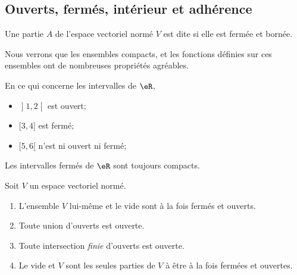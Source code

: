 \subsection{Ouverts, fermés, intérieur et adhérence}

\begin{proposition}
	Une partie $A$ de l'espace vectoriel normé $V$ est dite  si elle est fermée et bornée.
\end{proposition}

Nous verrons que les ensembles compacts, et les fonctions définies sur ces ensembles ont de nombreuses propriétés agréables.

\begin{example}		\label{ExempleFermeIntevrR}
	En ce qui concerne les intervalles de $\eR$,
	\begin{itemize}
		\item $\mathopen] 1 , 2 \mathclose[$ est ouvert;
		\item $\mathopen[ 3,  4 \mathclose]$ est fermé;
		\item $\mathopen[ 5 , 6 [$ n'est ni ouvert ni fermé;
	\end{itemize}
	Les intervalles fermés de $\eR$ sont toujours compacts.
\end{example}

\begin{proposition}		\label{PropTopologieAx}
	Soit $V$ un espace vectoriel normé.
	\begin{enumerate}
		\item
			L'ensemble $V$ lui-même et le vide sont à la fois fermés et ouverts.
		\item
			Toute union d'ouverts est ouverte.
		\item
			Toute intersection \emph{finie} d'ouverts est ouverte.
		\item		\label{ItemPropTopologieAxiv}
			Le vide et $V$ sont les seules parties de $V$ à être à la fois fermées et ouvertes.
	\end{enumerate}
\end{proposition}

